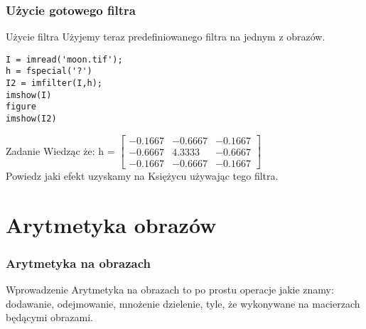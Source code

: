 \documentclass{beamer}
\begin{document}
\begin{frame}[fragile]
\frametitle{Użycie gotowego filtra}
\begin{block}{Użycie filtra}
Użyjemy teraz predefiniowanego filtra na jednym z obrazów.
\end{block}

\begin{example}
\begin{lstlisting}
I = imread('moon.tif');
h = fspecial('?')
I2 = imfilter(I,h);
imshow(I)
figure
imshow(I2)
\end{lstlisting}
\end{example}

\begin{alertblock}{Zadanie}
Wiedząc że: h = $\begin{bmatrix}
   -0.1667  & -0.6667 &  -0.1667\\
   -0.6667  &  4.3333 &  -0.6667\\
   -0.1667  & -0.6667 &  -0.1667
\end{bmatrix}$\\
Powiedz jaki efekt uzyskamy na Księżycu używając tego filtra.
\end{alertblock}

\end{frame}

\section{Arytmetyka obrazów}


\begin{frame}[fragile]
\frametitle{Arytmetyka na obrazach}
\begin{block}{Wprowadzenie}
Arytmetyka na obrazach to po prostu operacje jakie znamy: dodawanie, odejmowanie, mnożenie dzielenie, tyle, że wykonywane na macierzach będącymi obrazami.
\end{block}
\end{frame}
\end{document}
